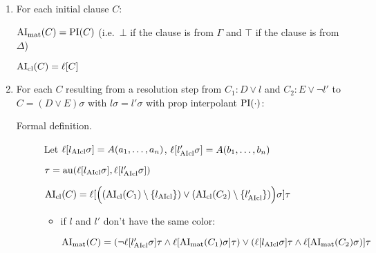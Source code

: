 \documentclass[,%
	paper=a4,%
	DIV14, %
	twoside=false,%
	liststotoc,
	bibtotoc,
	draft=false,%
	numbers=noendperiod
]{scrartcl}
\begin{document}
\begin{enumerate}
	\item 
		For each initial clause $C$:

		$\operatorname{AI}_\mathrm{mat}(C) = \operatorname{PI}(C)$ (i.e.~$\bot$ if the clause is from $\Gamma$ and $\top$ if the clause is from $\Delta$)

		$\operatorname{AI}_\mathrm{cl}(C) = \ell[C]$

	\item
		For each $C$ resulting from a resolution step from $C_1: D\lor l$ and $C_2: E\lor \lnot l'$ to $C = (D \lor E)\sigma$ with $l\sigma = l'\sigma$ with prop interpolant $\operatorname{PI}(\cdot)$:


		\begin{description}
			\item[Formal definition.]

				Let 
				$\ell[l_{\operatorname{AIcl}}\sigma] = A(a_1, \dotsc, a_n)$, $\ell[l_{\operatorname{AIcl}}'\sigma] = A(b_1, \dotsc, b_n)$

				$\tau = \operatorname{au}(\ell[l_{\operatorname{AIcl}}\sigma], \ell[l'_{\operatorname{AIcl}}\sigma])$

				$\operatorname{AI}_\mathrm{cl}(C) =
				\ell[\Big( (\operatorname{AI}_\mathrm{cl}(C_1) \setminus \{l_{\operatorname{AIcl}}\}) \lor (\operatorname{AI}_\mathrm{cl}(C_2)\setminus \{l_{\operatorname{AIcl}}'\}) \Big)\sigma] \tau$ 



				\begin{itemize}
					\item if $l$ and $l'$ don't have the same color:

						$\operatorname{AI}_\mathrm{mat}(C) =
						(\lnot {\ell[l'\ensuremath{_{\operatorname{AIcl}}}\sigma]\tau} \land \ell[\operatorname{AI}_\mathrm{mat}(C_1)\sigma]\tau) \lor
						(\ell[l_{\operatorname{AIcl}}\sigma]\tau \land \ell[\operatorname{AI}_\mathrm{mat}(C_2)\sigma) ]\tau
						$








\end{itemize}
\end{description}
\end{enumerate}
\end{document}
